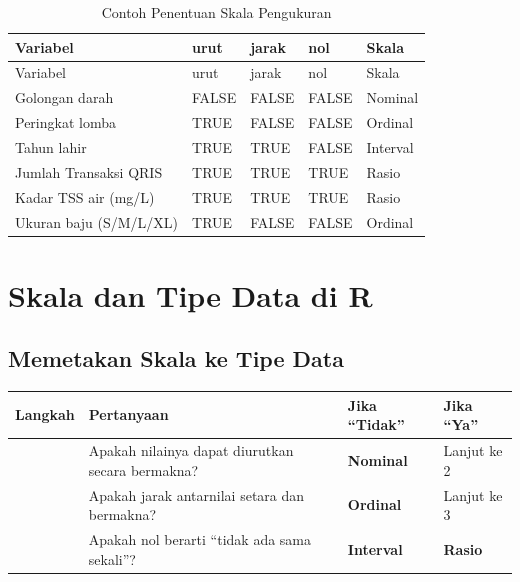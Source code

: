 \documentclass[
  indonesian,
  letterpaper,
]{book}
\newcounter{none} %
\begin{document}
\begin{longtable}[]{@{}lllll@{}}
\caption{Contoh Penentuan Skala Pengukuran}\tabularnewline
\toprule\noalign{}
Variabel & urut & jarak & nol & Skala \\
\midrule\noalign{}
\endfirsthead
\toprule\noalign{}
Variabel & urut & jarak & nol & Skala \\
\midrule\noalign{}
\endhead
\bottomrule\noalign{}
\endlastfoot
Golongan darah & FALSE & FALSE & FALSE & Nominal \\
Peringkat lomba & TRUE & FALSE & FALSE & Ordinal \\
Tahun lahir & TRUE & TRUE & FALSE & Interval \\
Jumlah Transaksi QRIS & TRUE & TRUE & TRUE & Rasio \\
Kadar TSS air (mg/L) & TRUE & TRUE & TRUE & Rasio \\
Ukuran baju (S/M/L/XL) & TRUE & FALSE & FALSE & Ordinal \\
\end{longtable}

\section{Skala dan Tipe Data di R}\label{skala-dan-tipe-data-di-r}

\subsection{Memetakan Skala ke Tipe
Data}\label{memetakan-skala-ke-tipe-data}

{\def\LTcaptype{none} %
\begin{longtable}[]{@{}
  >{\centering\arraybackslash}p{}
  >{\raggedright\arraybackslash}p{}
  >{\raggedright\arraybackslash}p{}
  >{\raggedright\arraybackslash}p{}@{}}
\toprule\noalign{}
\begin{minipage}[b]{\linewidth}\centering
Langkah
\end{minipage} & \begin{minipage}[b]{\linewidth}\raggedright
Pertanyaan
\end{minipage} & \begin{minipage}[b]{\linewidth}\raggedright
Jika ``Tidak''
\end{minipage} & \begin{minipage}[b]{\linewidth}\raggedright
Jika ``Ya''
\end{minipage} \\
\midrule\noalign{}
\endhead
\bottomrule\noalign{}
\endlastfoot
1 & Apakah nilainya dapat diurutkan secara bermakna? & \textbf{Nominal}
& Lanjut ke 2 \\
2 & Apakah jarak antarnilai setara dan bermakna? & \textbf{Ordinal} &
Lanjut ke 3 \\
3 & Apakah nol berarti ``tidak ada sama sekali''? & \textbf{Interval} &
\textbf{Rasio} \\
\end{longtable}
}
\end{document}
